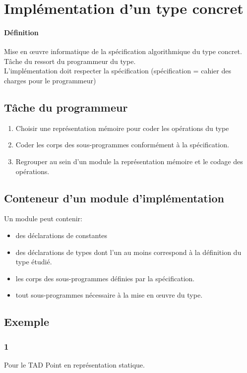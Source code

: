 \section{Implémentation d'un type concret}
	\paragraph{Définition}
		Mise en œuvre informatique de la spécification algorithmique du type concret.\\
		Tâche du ressort du programmeur du type.\\
		L'implémentation doit respecter la spécification (spécification = cahier des charges pour le
			programmeur)

	\subsection{Tâche du programmeur}
		\begin{enumerate}
			\item Choisir une représentation mémoire pour coder les opérations du type
			\item Coder les corps des sous-programmes conformément à la spécification.
			\item Regrouper au sein d'un module la représentation mémoire et le codage des opérations. 
		\end{enumerate}

	\subsection{Conteneur d'un module d'implémentation}
		Un module peut contenir: 
		\begin{itemize}
			\item des déclarations de constantes
			\item des déclarations de types dont l'un au moins correspond à la définition du type étudié.
			\item les corps des sous-programmes définies par la spécification.
			\item tout sous-programmes nécessaire à la mise en œuvre du type. 
		\end{itemize}

	\subsection{Exemple}
		\subsubsection{1}
		Pour le TAD Point en représentation statique.
		

